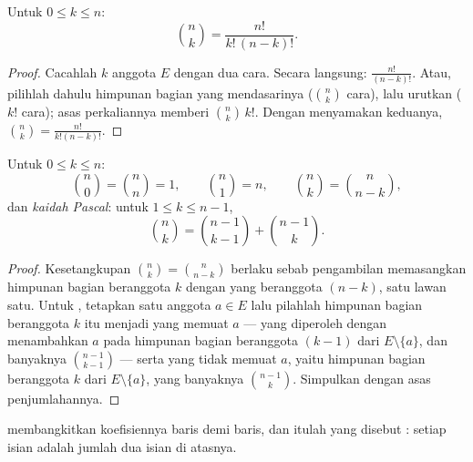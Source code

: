 \begin{theorem}\label{thm:g12:comb:binomformula}
Untuk $0 \leq k \leq n$:
\[
\binom{n}{k} = \frac{n!}{k!\,(n-k)!} .
\]
\end{theorem}

\begin{proof}
Cacahlah  $k$ anggota $E$ dengan dua cara. Secara langsung:
$\frac{n!}{(n-k)!}$. Atau, pilihlah dahulu himpunan bagian yang mendasarinya
($\binom nk$ cara), lalu urutkan ($k!$ cara); asas perkaliannya
memberi $\binom{n}{k}\,k!$. Dengan menyamakan keduanya,
$\binom nk = \frac{n!}{k!(n-k)!}$.
\end{proof}

\begin{proposition}\label{prop:g12:comb:identities}
Untuk $0 \leq k \leq n$:
\[
\binom{n}{0} = \binom{n}{n} = 1, \qquad
\binom{n}{1} = n, \qquad
\binom{n}{k} = \binom{n}{n-k},
\]
dan \emph{kaidah Pascal}: untuk $1 \leq k \leq n-1$,
\[
\binom{n}{k} = \binom{n-1}{k-1} + \binom{n-1}{k}.
\]
\end{proposition}

\begin{proof}
Kesetangkupan $\binom nk = \binom{n}{n-k}$ berlaku sebab pengambilan 
memasangkan himpunan bagian beranggota $k$ dengan yang beranggota $(n-k)$, satu
lawan satu. Untuk , tetapkan satu anggota $a \in E$ lalu pilahlah
himpunan bagian beranggota $k$ itu menjadi yang memuat $a$ --- yang diperoleh
dengan menambahkan $a$ pada himpunan bagian beranggota $(k-1)$ dari
$E \setminus \{a\}$, dan banyaknya $\binom{n-1}{k-1}$ --- serta
yang tidak memuat $a$, yaitu himpunan bagian beranggota $k$ dari
$E \setminus \{a\}$, yang banyaknya $\binom{n-1}{k}$. Simpulkan dengan asas
penjumlahannya.
\end{proof}

 membangkitkan koefisiennya baris demi baris, dan itulah
yang disebut \emph{}: setiap isian adalah jumlah dua isian di atasnya.

